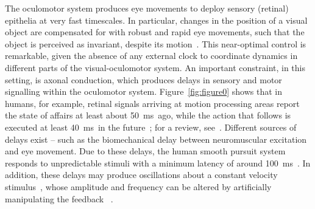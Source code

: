 \documentclass[a4paper]{article} %
\newcommand{\ms}{\si{\milli\second}}%
\begin{document}
The oculomotor system produces eye movements to deploy sensory (retinal)
epithelia at very fast timescales. In particular, changes in the
position of a visual object are compensated for with robust and rapid
eye movements, such that the object is perceived as invariant, despite
its motion~\citep{Ilg97,Lisberger87}. This near-optimal control
is remarkable, given the absence of any external clock to coordinate dynamics in
different parts of the visual-oculomotor system. An important constraint, in
this setting, is axonal conduction, which produces delays in sensory and motor
signalling within the oculomotor system. 
Figure~\ref{fig:figure0} shows that in humans, for example, retinal signals
arriving at motion processing areas report the state of affairs at least about
50~\ms\ ago, while the action that follows is executed at least 40~\ms\ in the
future~\citep{Inui06}; for a review, see~\citep{Masson10a}.  Different sources of delays exist -- such as the
biomechanical delay between neuromuscular excitation and eye movement. Due to
these delays, the human smooth pursuit system responds to unpredictable stimuli
with a minimum latency of around 100~\ms~\citep{Wyatt87}. In addition, these
delays may produce oscillations about a constant velocity
stimulus~\citep{Robinson86,Robinson65}, whose amplitude and frequency can be
altered by artificially manipulating the feedback ~\citep{Goldreich92}.
\end{document}
